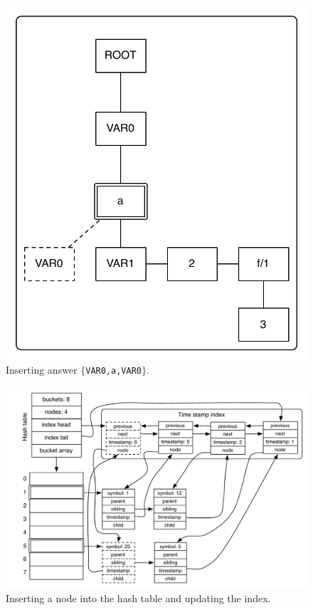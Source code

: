 \begin{figure}[ht]
  \centering
    \includegraphics[scale=0.45]{tst_insert.pdf}
  \caption{Inserting answer $\{$\texttt{VAR0,a,VAR0}$\}$.}
  \label{fig:tst_chain_insert}
\end{figure}

\begin{figure}[ht]
  \centering
    \includegraphics[scale=0.6]{hash_table_insert.pdf}
  \caption{Inserting a node into the hash table and updating the index.}
  \label{fig:hash_table_insert}
\end{figure}

